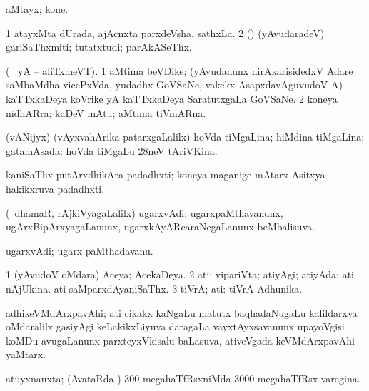 {\bentry
{} 
\gl{\nA}
\expl{}
\bmng
aMtayx; kone. 
\emng
\eentry

\bentry
{}
\gl{\nA}
\expl{\Latin}
\bmng
\bnum
\num{1} atayxMta dUrada, ajAcnxta parxdeVsha, sathxLa. 
\num{2} (\rUpa) (yAvudaradeV) gariSaThxmiti; tutatxtudi; parAkASeThx. 
\enum
\emng
\eentry

\bentry
{} 
\gl{\nA}
\expl{}
(\bava\  yA  \ucAcx-- aliTxmeVT).\bmng
\bnum
\num{1} aMtima beVDike; (yAvudanunx nirAkarisidedxV Adare saMbaMdha vicePxVda, yudadhx GoVSaNe, \mo vakekx AsapxdavAguvudoV A) kaTTxkaDeya koVrike yA kaTTxkaDeya SaratutxgaLa GoVSaNe. 
\num{2} koneya nidhARra; kaDeV mAtu; aMtima tiVmARna. 
\enum
\emng
\eentry

\bentry
{} 
\gl{\gu}
\expl{}
\bmng
(vANijyx) (vAyxvahArika patarxgaLalilx) hoVda tiMgaLina; hiMdina tiMgaLina; gatamAsada:  hoVda tiMgaLu 28neV tAriVKina. 
\emng
\eentry

\bentry
{} 
\gl{\nA}
\expl{}
\bmng
kaniSaThx putArxdhikAra padadhxti; koneya maganige mAtarx Asitxya hakikxruva padadhxti. 
\emng
\eentry

\bentry
{} 
\gl{\gu}
\expl{}
\bmng
(\kanmu\ dhamaR, rAjkiVyagaLalilx) ugarxvAdi; ugarxpaMthavanunx, ugArxBipArxyagaLanunx, ugarxkAyARcaraNegaLanunx beMbalisuva. 
\emng
\eentry

\bentry
{} 
\gl{\nA}
\expl{}
\bmng
ugarxvAdi; ugarx paMthadavanu. 
\emng
\eentry

\bentry
{} 
\gl{\sapUpa}
\expl{}
\bmng
\bnum
\num{1} (yAvudoV oMdara) Aceya; AcekaDeya. 
\num{2} ati; vipariVta; atiyAgi; atiyAda:  ati nAjUkina.  ati saMparxdAyaniSaThx. 
\num{3} tiVrA; ati:  tiVrA Adhunika. 
\enum
\emng
\eentry

\bentry
{} 
\gl{\nA}
\expl{}
\bmng
adhikeVMdArxpavAhi; ati cikakx kaNgaLu matutx baqhadaNugaLu kalildarxva oMdaralilx gasiyAgi keLakikxLiyuva daragaLa vayxtAyxsavanunx upayoVgisi koMDu avugaLanunx parxteyxVkisalu baLasuva, ativeVgada keVMdArxpavAhi yaMtarx. 
\emng
\eentry

\bentry
{} 
\gl{\gu}
\bmng
atuyxnanxta; (AvataRda \vi) 300 megahaTfRsxniMda 3000 megahaTfRsx varegina. 
\emng
\eentry

}
